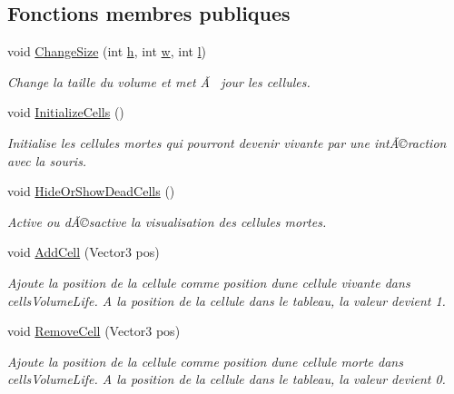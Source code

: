 \subsection*{Fonctions membres publiques}
\begin{DoxyCompactItemize}
\item 
void \mbox{\hyperlink{class_edit_mode_manager_acab9d2ee3853d18b73e82135d800c341}{Change\+Size}} (int \mbox{\hyperlink{class_edit_mode_manager_ad0e09cececc48bcb4e7b768fa35dc954}{h}}, int \mbox{\hyperlink{class_edit_mode_manager_ad9e4950cf24abf3ede8c0891c4df7b77}{w}}, int \mbox{\hyperlink{class_edit_mode_manager_a1979d9d74b3ead0806d3aa58f92a298c}{l}})
\begin{DoxyCompactList}\small\item\em Change la taille du volume et met Ã  jour les cellules. \end{DoxyCompactList}\item 
void \mbox{\hyperlink{class_edit_mode_manager_a8a950f58c809a7161d85e5d9a73e4d15}{Initialize\+Cells}} ()
\begin{DoxyCompactList}\small\item\em Initialise les cellules mortes qui pourront devenir vivante par une intÃ©raction avec la souris. \end{DoxyCompactList}\item 
void \mbox{\hyperlink{class_edit_mode_manager_ad64498838abd29826c929cad104924be}{Hide\+Or\+Show\+Dead\+Cells}} ()
\begin{DoxyCompactList}\small\item\em Active ou dÃ©sactive la visualisation des cellules mortes. \end{DoxyCompactList}\item 
void \mbox{\hyperlink{class_edit_mode_manager_a9f9fbe57f5bbb6b90dc1dc321d411c54}{Add\+Cell}} (Vector3 pos)
\begin{DoxyCompactList}\small\item\em Ajoute la position de la cellule comme position d\textquotesingle{}une cellule vivante dans cells\+Volume\+Life. A la position de la cellule dans le tableau, la valeur devient 1. \end{DoxyCompactList}\item 
void \mbox{\hyperlink{class_edit_mode_manager_a8a8c1a3a9558fbbcfa7c15d8ce48a264}{Remove\+Cell}} (Vector3 pos)
\begin{DoxyCompactList}\small\item\em Ajoute la position de la cellule comme position d\textquotesingle{}une cellule morte dans cells\+Volume\+Life. A la position de la cellule dans le tableau, la valeur devient 0. \end{DoxyCompactList}\item 

\end{DoxyCompactItemize}
